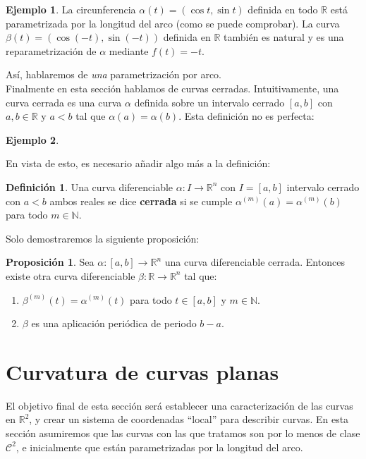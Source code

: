 \documentclass{article}
\theoremstyle{definition}
\newtheorem{prop}{Proposición}
\newtheorem{define}{Definición}
\newtheorem{ejem}{Ejemplo}
\newcommand{\reales}{\mathbb{R}}
\newcommand{\naturales}{\mathbb{N}}
\newcommand{\claseck}[1]{\mathcal{C}^{#1}}
\begin{document}
\begin{ejem}
	La circunferencia $\alpha(t) = (\cos t, \sin t)$ definida en todo $\reales$ está parametrizada por la longitud del arco (como se puede comprobar). La curva $\beta(t) = (\cos (-t), \sin (-t))$ definida en $\reales$ también es natural y es una reparametrización de $\alpha$ mediante $f(t) = -t$. 
\end{ejem}

Así, hablaremos de \textit{una} parametrización por arco.\\ 

Finalmente en esta sección hablamos de curvas cerradas. Intuitivamente, una curva cerrada es una curva $\alpha$ definida sobre un intervalo cerrado $[a, b]$ con $a,b \in \reales$ y $a < b$ tal que $\alpha(a) = \alpha(b)$. Esta definición no es perfecta:

\begin{ejem}
	
\end{ejem}

En vista de esto, es necesario añadir algo más a la definición:

\begin{define}
	Una curva diferenciable $\alpha: I \rightarrow \reales^{n}$ con $I = [a, b]$ intervalo cerrado con $a < b$ ambos reales se dice \textbf{cerrada} si se cumple $\alpha^{(m)}(a) = \alpha^{(m)}(b)$ para todo $m \in \naturales$.
\end{define}

Solo demostraremos la siguiente proposición:

\begin{prop}
	Sea $\alpha: [a, b] \rightarrow \reales^{n}$ una curva diferenciable cerrada. Entonces existe otra curva diferenciable $\beta: \reales \rightarrow \reales^{n}$ tal que:
	\begin{enumerate}
		\item
		$\beta^{(m)}(t) = \alpha^{(m)}(t)$ para todo $t \in [a, b]$ y $m \in \naturales$.
		\item
		$\beta$ es una aplicación periódica de periodo $b-a$.
	\end{enumerate}
\end{prop}













\section{Curvatura de curvas planas}
El objetivo final de esta sección será establecer una caracterización de las curvas en $\reales^{2}$, y crear un sistema de coordenadas ``local'' para describir curvas. En esta sección asumiremos que las curvas con las que tratamos son por lo menos de clase $\claseck{2}$, e inicialmente que están parametrizadas por la longitud del arco.\\ 
\end{document}
